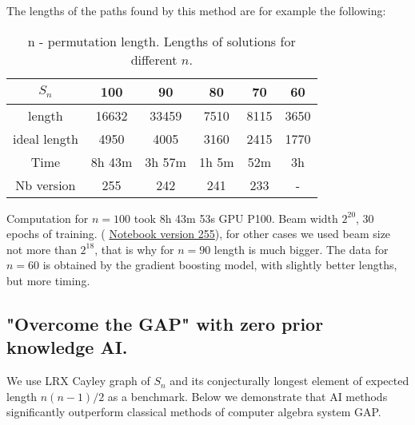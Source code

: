 \documentclass[atmp]{ipart_v1}
\numberwithin{equation}{section}
\theoremstyle{plain}%
\begin{document}
The lengths of the paths found by this method are for example the following:

\begin{table}[h]
    \centering
    \begin{tabular}{|c|c|c|c|c|c|}
        \hline
        $S_n$  & 100 & 90   & 80  & 70 & 60  \\
        \hline
        length        & 16632 & 33459  & 7510  & 8115 & 3650 \\
        \hline
        ideal length &  4950   & 4005  & 3160  & 2415 & 1770 \\
        \hline
        Time         &  8h 43m & 3h 57m   & 1h 5m  & 52m & 3h  \\
        \hline
        Nb version   &   255   &  242     & 241    & 233  & - \\
        \hline
    \end{tabular}
    \captionsetup{skip=10pt} 
    \caption{n - permutation length. Lengths of solutions for different $n$.   }
    \label{tab:example}
\end{table}

Computation for $n=100$ took 8h 43m 53s GPU P100. Beam width $ {2}^{20}$, 30 epochs of training. ( \href{https://www.kaggle.com/code/alexandervc/lrx-cayleypy-rl-mdqn?scriptVersionId=223954525}{Notebook version 255}), for other cases we used beam size not more than $ {2}^{18}$, that is why for $n=90$ length is much bigger. The data for $n=60$ is obtained by the gradient boosting model, with slightly better lengths, but more timing.

\subsection{"Overcome the GAP" with zero prior knowledge AI. }

We use LRX Cayley graph of $S_n$ and its conjecturally longest element of expected length $n(n-1)/2$ as a benchmark. Below we demonstrate that AI methods significantly outperform classical methods of computer algebra system GAP. 
\end{document}
